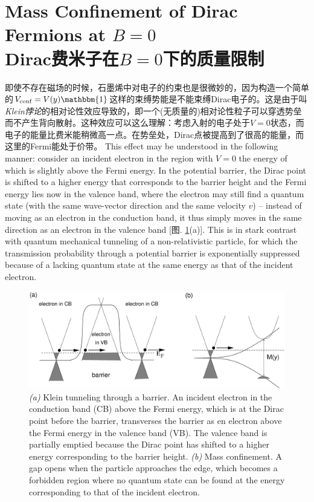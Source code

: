 \documentclass[10pt]{book}
\newcommand{\bone}{\mathbbm{1}}
\newcommand\itt{\it\color{blue}}
\begin{document}
\section*{Mass Confinement of Dirac Fermions at $B=0$\\\bf Dirac费米子在$B=0$下的质量限制}

即使不存在磁场的时候，石墨烯中对电子的约束也是很微妙的，因为构造一个简单的$V_{\rm conf}=V(y)\bone$这样的束缚势能是不能束缚Dirac电子的。这是由于叫{\itt Klein悖论}的相对论性效应导致的，即一个(无质量的)相对论性粒子可以穿透势垒而不产生背向散射\cite{klein}。这种效应可以这么理解：考虑入射的电子处于$V=0$状态，而电子的能量比费米能稍微高一点。在势垒处，Dirac点被提高到了很高的能量，而这里的Fermi能处于价带。
This effect may be understood in the following manner: consider an incident electron in the region with $V=0$ the
energy of which is slightly above the Fermi energy. In the potential barrier, the Dirac point is shifted to a higher
energy that corresponds to the barrier height and the Fermi energy lies now in the valence band, where the electron
may still find a quantum state (with the same wave-vector direction and the same velocity $v$) -- instead of 
moving as an electron in the conduction band, it thus simply moves in the same direction as an electron in the valence
band [图. \ref{fig2:02}(a)]. This is in stark contrast with quantum mechanical tunneling of a non-relativistic particle,
for which the transmission probability through a potential barrier is exponentially suppressed because of a lacking
quantum state at the same energy as that of the incident electron. 


\begin{figure}
\centering
\includegraphics[width=12cm,angle=0]{KleinTunneling.eps}
\caption{ {\sl (a)} Klein tunneling through a barrier. An incident electron in the conduction band (CB) above the Fermi energy, 
which is at the Dirac point before the barrier, transverses the barrier as en electron above the Fermi energy in the valence band (VB).
The valence band is partially emptied because the Dirac point has shifted to a higher energy corresponding to the barrier height.
{\sl (b)} Mass confinement. A gap opens when the particle approaches the edge, which becomes a forbidden region
where no quantum state can be found at the energy corresponding to that of the incident electron.}
\label{fig2:02}
\end{figure}
\end{document}
